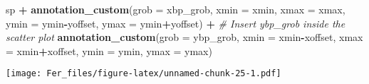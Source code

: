 \documentclass[
]{article}
\newenvironment{Shaded}{\begin{snugshade}}{\end{snugshade}}
\newcommand{\AttributeTok}[1]{\textcolor[rgb]{0.13,0.29,0.53}{#1}}
\newcommand{\CommentTok}[1]{\textcolor[rgb]{0.56,0.35,0.01}{\textit{#1}}}
\newcommand{\FunctionTok}[1]{\textcolor[rgb]{0.13,0.29,0.53}{\textbf{#1}}}
\newcommand{\NormalTok}[1]{#1}
\newcommand{\SpecialCharTok}[1]{\textcolor[rgb]{0.81,0.36,0.00}{\textbf{#1}}}
\begin{document}
\begin{Shaded}
\begin{Highlighting}[]
\NormalTok{sp }\SpecialCharTok{+} \FunctionTok{annotation\_custom}\NormalTok{(}\AttributeTok{grob =}\NormalTok{ xbp\_grob, }\AttributeTok{xmin =}\NormalTok{ xmin, }\AttributeTok{xmax =}\NormalTok{ xmax, }
                       \AttributeTok{ymin =}\NormalTok{ ymin}\SpecialCharTok{{-}}\NormalTok{yoffset, }\AttributeTok{ymax =}\NormalTok{ ymin}\SpecialCharTok{+}\NormalTok{yoffset) }\SpecialCharTok{+}
  \CommentTok{\# Insert ybp\_grob inside the scatter plot}
  \FunctionTok{annotation\_custom}\NormalTok{(}\AttributeTok{grob =}\NormalTok{ ybp\_grob,}
                    \AttributeTok{xmin =}\NormalTok{ xmin}\SpecialCharTok{{-}}\NormalTok{xoffset, }\AttributeTok{xmax =}\NormalTok{ xmin}\SpecialCharTok{+}\NormalTok{xoffset, }
                    \AttributeTok{ymin =}\NormalTok{ ymin, }\AttributeTok{ymax =}\NormalTok{ ymax)}
\end{Highlighting}
\end{Shaded}

\texttt{[image: Fer\_files/figure-latex/unnamed-chunk-25-1.pdf]}
\end{document}

